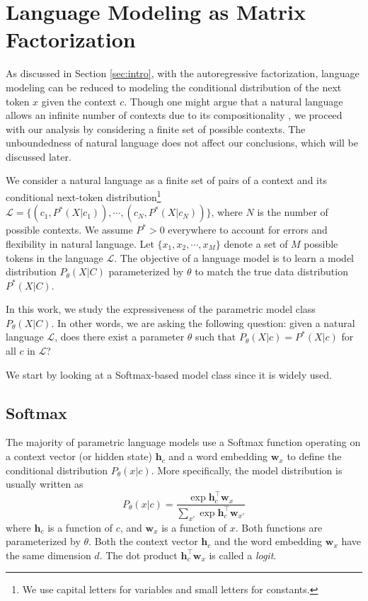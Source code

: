 
\section{Language Modeling as Matrix Factorization}\label{sec:rank}

As discussed in Section \ref{sec:intro}, with the autoregressive factorization, language modeling can be reduced to modeling the conditional distribution of the next token $x$ given the context $c$. Though one might argue that a natural language allows an infinite number of contexts due to its compositionality \citep{pinker1994language}, we proceed with our analysis by considering a finite set of possible contexts. The unboundedness of natural language does not affect our conclusions, which will be discussed later.

We consider a natural language as a finite set of pairs of a context and its conditional next-token distribution\footnote{We use capital letters for variables and small letters for constants.} $\mathcal{L} = \{(c_1, P^*(X | c_1)), \cdots, (c_N, P^*(X | c_N))\}$, where $N$ is the number of possible contexts. We assume $P^* > 0$ everywhere to account for errors and flexibility in natural language. Let $\{x_1, x_2, \cdots, x_M\}$ denote a set of $M$ possible tokens in the language $\mathcal{L}$. The objective of a language model is to learn a model distribution $P_\theta(X | C)$ parameterized by $\theta$ to match the true data distribution $P^*(X | C)$.

In this work, we study the expressiveness of the parametric model class $P_\theta(X | C)$.
In other words, we are asking the following question: given a natural language $\mathcal{L}$, does there exist a parameter $\theta$ such that $P_\theta(X | c) = P^*(X | c)$ for all $c$ in $\mathcal{L}$?

We start by looking at a Softmax-based model class since it is widely used.

\subsection{Softmax}

The majority of parametric language models use a Softmax function operating on a context vector (or hidden state) $\mathbf{h}_c$ and a word embedding $\mathbf{w}_x$ to define the conditional distribution $P_\theta(x | c)$. More specifically, the model distribution is usually written as
\begin{equation}\label{eqn:softmax}
P_\theta(x | c) = \frac{\exp \mathbf{h}^\top_c \mathbf{w}_x}{\sum_{x'} \exp \mathbf{h}^\top_c \mathbf{w}_{x'}}
\end{equation}
where $\mathbf{h}_c$ is a function of $c$, and $\mathbf{w}_x$ is a function of $x$. Both functions are parameterized by $\theta$. Both the context vector $\mathbf{h}_c$ and the word embedding $\mathbf{w}_x$ have the same dimension $d$. The dot product $\mathbf{h}_c^\top \mathbf{w}_x$ is called a {\em logit}.

